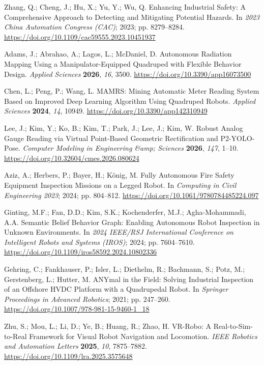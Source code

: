 Zhang, Q.; Cheng, J.; Hu, X.; Yu, Y.; Wu, Q. Enhancing Industrial Safety: A Comprehensive Approach to Detecting and Mitigating Potential Hazards. In \emph{2023 China Automation Congress (CAC)}; 2023; pp. 8279--8284. \url{https://doi.org/10.1109/cac59555.2023.10451937}

Adams, J.; Abrahao, A.; Lagos, L.; McDaniel, D. Autonomous Radiation Mapping Using a Manipulator-Equipped Quadruped with Flexible Behavior Design. \emph{Applied Sciences} \textbf{2026}, \emph{16}, 3500. \url{https://doi.org/10.3390/app16073500}

Chen, L.; Peng, P.; Wang, L. MAMRS: Mining Automatic Meter Reading System Based on Improved Deep Learning Algorithm Using Quadruped Robots. \emph{Applied Sciences} \textbf{2024}, \emph{14}, 10949. \url{https://doi.org/10.3390/app142310949}

Lee, J.; Kim, Y.; Ko, B.; Kim, T.; Park, J.; Lee, J.; Kim, W. Robust Analog Gauge Reading via Virtual Point-Based Geometric Rectification and P2-YOLO-Pose. \emph{Computer Modeling in Engineering \&amp; Sciences} \textbf{2026}, \emph{147}, 1--10. \url{https://doi.org/10.32604/cmes.2026.080624}

Aziz, A.; Herbers, P.; Bayer, H.; König, M. Fully Autonomous Fire Safety Equipment Inspection Missions on a Legged Robot. In \emph{Computing in Civil Engineering 2023}; 2024; pp. 804--812. \url{https://doi.org/10.1061/9780784485224.097}

Ginting, M.F.; Fan, D.D.; Kim, S.K.; Kochenderfer, M.J.; Agha-Mohammadi, A.A. Semantic Belief Behavior Graph: Enabling Autonomous Robot Inspection in Unknown Environments. In \emph{2024 IEEE/RSJ International Conference on Intelligent Robots and Systems (IROS)}; 2024; pp. 7604--7610. \url{https://doi.org/10.1109/iros58592.2024.10802336}

Gehring, C.; Fankhauser, P.; Isler, L.; Diethelm, R.; Bachmann, S.; Potz, M.; Gerstenberg, L.; Hutter, M. ANYmal in the Field: Solving Industrial Inspection of an Offshore HVDC Platform with a Quadrupedal Robot. In \emph{Springer Proceedings in Advanced Robotics}; 2021; pp. 247--260. \url{https://doi.org/10.1007/978-981-15-9460-1_18}

Zhu, S.; Mou, L.; Li, D.; Ye, B.; Huang, R.; Zhao, H. VR-Robo: A Real-to-Sim-to-Real Framework for Visual Robot Navigation and Locomotion. \emph{IEEE Robotics and Automation Letters} \textbf{2025}, \emph{10}, 7875--7882. \url{https://doi.org/10.1109/lra.2025.3575648}


